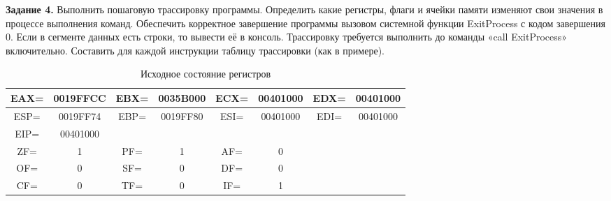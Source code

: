 \textbf{Задание 4.} Выполнить пошаговую трассировку программы. Определить какие регистры,  флаги и ячейки памяти изменяют свои значения в процессе выполнения команд. Обеспечить корректное завершение программы вызовом системной функции ExitProcess с кодом завершения 0. Если в сегменте данных есть строки, то вывести её в консоль. Трассировку требуется выполнить до команды «call ExitProcess» включительно. Составить для каждой инструкции таблицу трассировки (как в примере). \label{sec:4}

\begin{table}[H]
    \centering
    \caption{Исходное состояние регистров}
    \label{tab:registers_init}
    \small
    \renewcommand{\arraystretch}{1.3}
    \begin{tabular}{|c|c|c|c|c|c|c|c|}
    \hline
    \cellcolor{blue!30} EAX= & 0019FFCC & \cellcolor{blue!30} EBX= & 0035B000 & \cellcolor{blue!30} ECX= & 00401000 & \cellcolor{blue!30} EDX= & 00401000 \\
    \hline
    \cellcolor{blue!30} ESP= & 0019FF74 & \cellcolor{blue!30} EBP= & 0019FF80 & \cellcolor{blue!30} ESI= & 00401000 & \cellcolor{blue!30} EDI= & 00401000 \\
    \hline
    \cellcolor{blue!30} EIP= & 00401000 & \multicolumn{6}{c|}{\cellcolor{gray!30}} \\
    \hline
    \cellcolor{pink} ZF= & 1 & \cellcolor{pink} PF= & 1 & \cellcolor{pink} AF= & 0 & \multicolumn{2}{c|}{\cellcolor{gray!30}} \\
    \cline{1-6}
    \cellcolor{pink} OF= & 0 & \cellcolor{pink} SF= & 0 & \cellcolor{pink} DF= & 0 & \multicolumn{2}{c|}{\cellcolor{gray!30}} \\
    \cline{1-6}
    \cellcolor{pink} CF= & 0 & \cellcolor{pink} TF= & 0 & \cellcolor{pink} IF= & 1 & \multicolumn{2}{c|}{\cellcolor{gray!30}} \\
    \hline
    \end{tabular}
\end{table}

